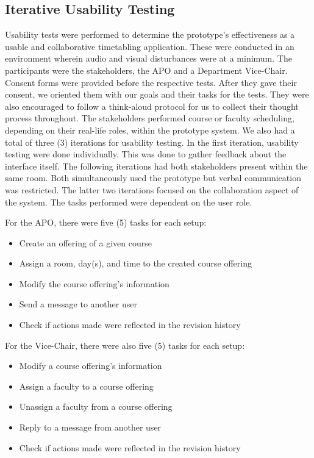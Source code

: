 \subsection{Iterative Usability Testing}
Usability tests were performed to determine the prototype's effectiveness as a usable and collaborative timetabling application. These were conducted in an environment wherein audio and visual disturbances were at a minimum. The participants were the stakeholders, the APO and a Department Vice-Chair. Consent forms were provided before the respective tests. After they gave their consent, we oriented them with our goals and their tasks for the tests. They were also encouraged to follow a think-aloud protocol for us to collect their thought process throughout. The stakeholders performed course or faculty scheduling, depending on their real-life roles, within the prototype system. We also had a total of three (3) iterations for usability testing. In the first iteration, usability testing were done individually. This was done to gather feedback about the interface itself. The following iterations had both stakeholders present within the same room. Both simultaneously used the prototype but verbal communication was restricted. The latter two iterations focused on the collaboration aspect of the system. The tasks performed were dependent on the user role.

For the APO, there were five (5) tasks for each setup:

\begin{itemize}
    \item Create an offering of a given course
    \item Assign a room, day(s), and time to the created course offering
    \item Modify the course offering's information
    \item Send a message to another user
    \item Check if actions made were reflected in the revision history
\end{itemize}

For the Vice-Chair, there were also five (5) tasks for each setup:

\begin{itemize}
    \item Modify a course offering's information
    \item Assign a faculty to a course offering
    \item Unassign a faculty from a course offering
    \item Reply to a message from another user
    \item Check if actions made were reflected in the revision history
\end{itemize}

